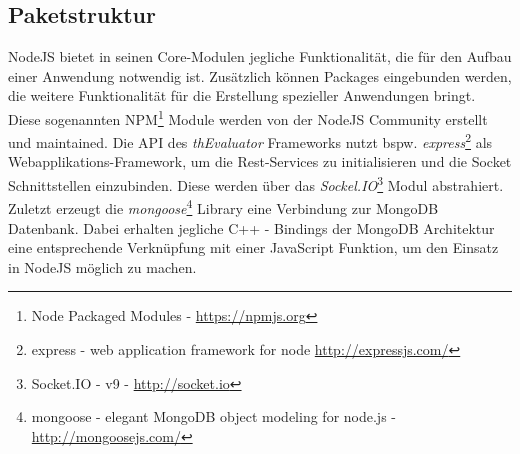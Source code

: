 \subsection{Paketstruktur}

NodeJS bietet in seinen Core-Modulen jegliche Funktionalität, die für den Aufbau einer Anwendung notwendig ist. Zusätzlich können Packages eingebunden werden, die weitere Funktionalität für die Erstellung spezieller Anwendungen bringt. Diese sogenannten NPM\footnote{Node Packaged Modules - \url{https://npmjs.org}} Module werden von der NodeJS Community erstellt und maintained. Die API des \textit{thEvaluator} Frameworks nutzt bspw. \textit{express}\footnote{express - web application framework for node \url{http://expressjs.com/}} als Webapplikations-Framework, um die Rest-Services zu initialisieren und die Socket Schnittstellen einzubinden. Diese werden über das \textit{Sockel.IO}\footnote{Socket.IO - v9 - \url{http://socket.io}} Modul abstrahiert. Zuletzt erzeugt die \textit{mongoose}\footnote{mongoose - elegant MongoDB object modeling for node.js - \url{http://mongoosejs.com/}} Library eine Verbindung zur MongoDB Datenbank. Dabei erhalten jegliche C++ - Bindings der MongoDB Architektur eine entsprechende Verknüpfung mit einer JavaScript Funktion, um den Einsatz in NodeJS möglich zu machen.

